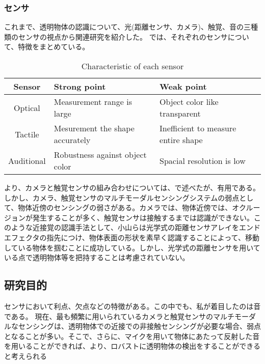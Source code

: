 \subsubsection{センサ}
\label{sec:related_work_sensor}
これまで、透明物体の認識について、光(距離センサ、カメラ)、触覚、音の三種類のセンサの視点から関連研究を紹介した。
では、それぞれのセンサについて、特徴をまとめている。

\begin{table}[b]
    \centering
    \caption{Characteristic of each sensor}
    \vspace{1zh}
    \begin{tabular}{c|p{12em}|p{12em}}\hline
        Sensor & Strong point & Weak point \\\hline\hline
        Optical & Measurement range is large  & Object color like transparent \\\hline
        Tactile & Mesurement the shape accurately & Inefficient to measure entire shape \\\hline
        Auditional & Robustness against object color & Spacial resolution is low \\\hline
    \end{tabular}
    \label{tab:related_work_summry}
\end{table}

より、カメラと触覚センサの組み合わせについては、で述べたが、有用である。しかし、カメラ、触覚センサのマルチモーダルセンシングシステムの弱点として、物体近傍のセンシングの弱さがある。カメラでは、物体近傍では、オクルージョンが発生することが多く、触覚センサは接触するまでは認識ができない。このような近接覚の認識手法として、小山ら\cite{koyama2015proximity2}は光学式の距離センサアレイをエンドエフェクタの指先につけ、物体表面の形状を素早く認識することによって、移動している物体を掴むことに成功している。しかし、光学式の距離センサを用いている点で透明物体等を把持することは考慮されていない。

\subsection{研究目的}
\label{sec:propose}
センサにおいて利点、欠点などの特徴がある。この中でも、私が着目したのは音である。
現在、最も頻繁に用いられているカメラと触覚センサのマルチモーダルなセンシングは、透明物体での近接での非接触センシングが必要な場合、弱点となることが多い。そこで、さらに、マイクを用いて物体にあたって反射した音を用いることができれば、より、ロバストに透明物体の検出をすることができると考えられる

